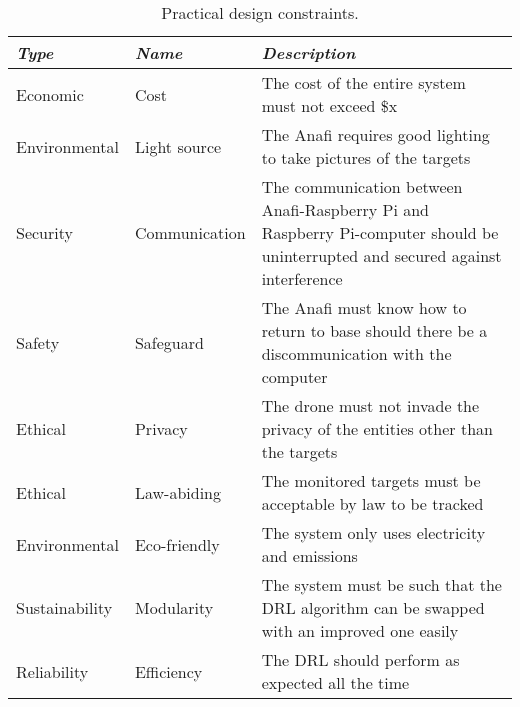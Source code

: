 \documentclass[../main.tex]{subfiles}
\begin{document}
\begin{table}[hbt!]
    \centering
    \caption{Practical design constraints.}
    \label{tab:practical-design-constraints}
    \begin{tabular}{ P{3cm} P{3cm} P{9cm} }
        \toprule
        \textit{Type} 
            & \textit{Name} 
                & \textit{Description} \\

        \midrule
        
        Economic 
            & Cost 
                & The cost of the entire system must not exceed \$x \\
        
        Environmental 
            & Light source 
                & The Anafi requires good lighting to 
                take pictures of the targets \\
        
        Security 
            & Communication 
                & The communication between Anafi-Raspberry Pi 
                and Raspberry Pi-computer should be uninterrupted 
                and secured against interference \\
        
        Safety 
            & Safeguard 
                & The Anafi must know how to return to base 
                should there be a discommunication with the computer \\
        
        Ethical 
            & Privacy 
                & The drone must not invade the privacy of 
                the entities other than the targets \\
        
        Ethical 
            & Law-abiding 
                & The monitored targets must be acceptable 
                by law to be tracked \\
        
        Environmental 
            & Eco-friendly 
                & The system only uses electricity and emissions \\
        
        Sustainability 
            & Modularity 
                & The system must be such that the DRL algorithm can be swapped with an improved one easily \\
        
        Reliability 
            & Efficiency 
                & The DRL should perform as expected all the time \\

        \bottomrule		
    \end{tabular}
\end{table}
\end{document}
